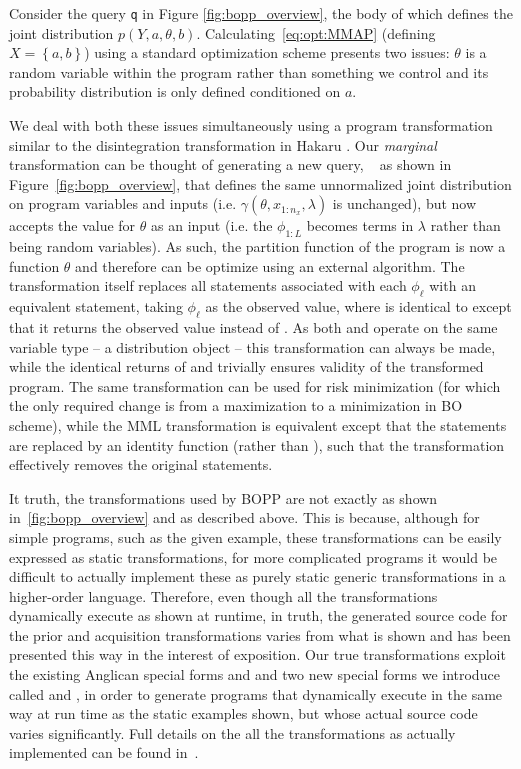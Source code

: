 
Consider the  query \texttt{q} in Figure \ref{fig:bopp_overview}, the body of which defines the joint distribution $p\left(Y,a,\theta,b\right)$.   Calculating~\eqref{eq:opt:MMAP} (defining $X=\left\{a,b\right\}$) using a standard optimization scheme presents two issues: $\theta$ is a random variable within the program rather than something we control and its probability distribution is only defined conditioned on $a$.

We deal with both these issues simultaneously using a program transformation similar to the disintegration transformation in Hakaru \citep{zinkov2016composing}. Our \emph{marginal} transformation can be thought of generating a new query, \qmarg~ as shown in Figure~\ref{fig:bopp_overview}, that defines the same unnormalized joint distribution on program variables and inputs (i.e. $\gamma(\theta,x_{1:n_x},\lambda)$ is unchanged), but now accepts the value for $\theta$ as an input (i.e. the $\phi_{1:L}$ becomes terms in $\lambda$ rather than being random variables).  As such, the partition function of the program is
now a function $\theta$ and therefore can be optimize using an external algorithm.
The transformation itself replaces all \sample statements associated with each $\phi_{\ell}$ with an equivalent \observes statement, taking $\phi_{\ell}$ as the observed value, where \observes is identical to \observe except that it returns the observed value instead of .  As both \sample and \observe operate on the same variable type -- a distribution object -- this transformation can always be made, while the identical returns of \sample and \observes trivially ensures validity of the transformed program.  The same transformation can be used for risk minimization (for which the
only required change is from a maximization to a minimization in BO scheme), while the MML transformation
is equivalent except that the \observe statements are replaced by an identity function (rather than \observes), such
that the transformation effectively removes the original \sample statements.

It truth, the transformations used by BOPP are not exactly as shown in~\ref{fig:bopp_overview}
and as described above.  This is because, although for simple programs, such as the given
example, these transformations can be easily expressed as static transformations, for more
complicated programs it would be difficult to actually implement these as purely static
generic transformations in a higher-order language.  Therefore, even though all the
transformations dynamically execute as shown at runtime, in truth, the generated source 
code for the prior and acquisition transformations varies from what is shown and has 
been presented this way in the interest of exposition.  Our true transformations exploit
the existing Anglican special forms  and  and two new
special forms we introduce called  and , in order to generate programs
that dynamically execute in the same way at run time as the static examples shown, but
whose actual source code varies significantly.  Full details on the all the transformations
as actually implemented can be found in~\cite{rainforth2017boppArxiv}.

